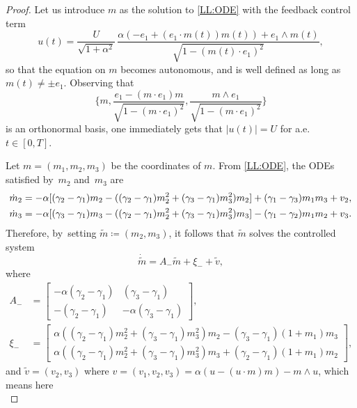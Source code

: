 \documentclass[JEP,XML,SOM,Unicode,NoEqCountersInSection,NoFloatCountersInSection,published]{cedram}
\theoremstyle{definition}
\begin{document}
\begin{proof}
Let us introduce $m$ as the solution to \eqref{LL:ODE} with the feedback control term
\begin{equation*}
u (t) = \frac{U}{\sqrt{1 + \alpha^2}}\, \frac{\alpha (- e_1 + (e_1 \cdot m(t)) m(t)) + e_1 \wedge m(t)}{\sqrt{1- (m(t) \cdot e_1)^2}},
\end{equation*}
so that the equation on $m$ becomes autonomous, and is well defined as long as \hbox{$m (t) \neq \pm e_1$}. Observing that
\[
\biggl\{m,\frac{e_1-(m\cdot e_1)m}{\sqrt{1-(m\cdot e_1)^2}},\frac{m\wedge e_1}{\sqrt{1-(m\cdot e_1)^2}}\biggr\}
\]
is an orthonormal basis, one immediately gets that $|u(t)|=U$ for a.e. $t\in [0,T]$.

Let $m=(m_1,m_2,m_3)$ be the coordinates of $m$. From \eqref{LL:ODE}, the ODEs satisfied by~$m_2$ and~$m_3$ are
\begin{align*} \notag
\dot m_2 &= - \alpha [ (\gamma_2 - \gamma_1) m_2 - ((\gamma_2 - \gamma_1) m_2^2 + (\gamma_3 - \gamma_1) m_3^2) m_2 ] + (\gamma_1 - \gamma_3) m_1 m_3 + v_2, \\
\dot m_3 &= - \alpha [ (\gamma_3 - \gamma_1) m_3 - ((\gamma_2 - \gamma_1) m_2^2 + (\gamma_3 - \gamma_1) m_3^2) m_3 ] - (\gamma_1 - \gamma_2) m_1 m_2 + v_3.
\end{align*}
Therefore, by~setting $\widetilde{m} \coloneqq (m_2, m_3)$, it follows that $\widetilde{m}$ solves the controlled system
\begin{equation} \label{eq:ode_tilde_m_2}
\dot{\tilde{m}} = A_- \tilde{m} + \xi_- + \tilde v,
\end{equation}
where
\begin{align*}
A_- &=
\begin{bmatrix}
- \alpha (\gamma_2 - \gamma_1) & (\gamma_3 - \gamma_1) \\
- (\gamma_2 - \gamma_1) & - \alpha (\gamma_3 - \gamma_1)
\end{bmatrix}, \\
\xi_- &=
\begin{bmatrix}
\alpha ((\gamma_2 - \gamma_1) m_2^2 + (\gamma_3 - \gamma_1) m_3^2) m_2 - (\gamma_3 - \gamma_1) (1 + m_1) m_3 \\
\alpha ((\gamma_2 - \gamma_1) m_2^2 + (\gamma_3 - \gamma_1) m_3^2) m_3 + (\gamma_2 - \gamma_1) (1 + m_1) m_2
\end{bmatrix},
\end{align*}
and $\tilde v = (v_2, v_3)$ where $v = (v_1,v_2,v_3)=\alpha (u - (u \cdot m) m) - m \wedge u$, which means here
\begin{equation*}

\end{equation*}
\end{proof}
\end{document}
